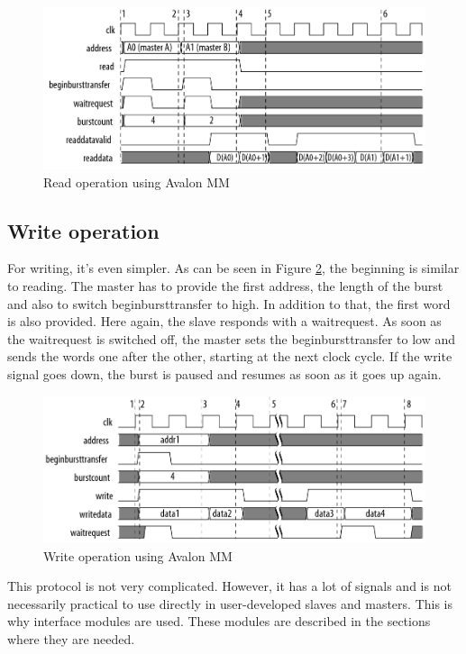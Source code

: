 \begin{figure}[ht!]
  \center
  \includegraphics[width=\linewidth]{"Chapter5-MAU_CTRLU/res/avalon_mm_read.png"}
  \caption{Read operation using Avalon MM}
  \label{fig:avalon/mm_read}
\end{figure}

\subsection{Write operation}

For writing, it's even simpler. As can be seen in Figure \ref{fig:avalon/mm_write}, the beginning 
is similar to reading. The master has to provide the first address, the length of the 
burst and also to switch beginbursttransfer to high. In addition to that, the first word 
is also provided. Here again, the slave responds with a waitrequest. As soon as the waitrequest 
is switched off, the master sets the beginbursttransfer to low and sends the words one after the other, 
starting at the next clock cycle. If the write signal goes down, the burst is paused and resumes 
as soon as it goes up again.

\begin{figure}[ht!]
  \center
  \includegraphics[width=\linewidth]{"Chapter5-MAU_CTRLU/res/avalon_mm_write.png"}
  \caption{Write operation using Avalon MM}
  \label{fig:avalon/mm_write}
\end{figure}

This protocol is not very complicated. However, it has a lot of signals and is not necessarily 
practical to use directly in user-developed slaves and masters. This is why interface modules are 
used. These modules are described in the sections where they are needed.


